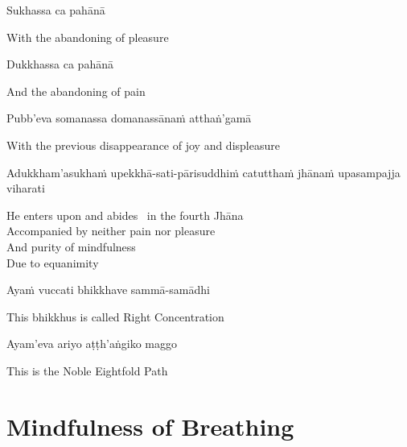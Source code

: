 Sukhassa ca pahānā

\begin{english}
  With the abandoning of pleasure
\end{english}

Dukkhassa ca pahānā

\begin{english}
  And the abandoning of pain
\end{english}

Pubb'eva somanassa domanassānaṁ atthaṅ'gamā

\begin{english}
  With the previous disappearance of joy and displeasure\makeatletter\hyperlink{endnote67-appendix}\makeatother
\end{english}

\begin{pali-hang}
  Adukkham'asukhaṁ upekkhā-sati-pārisuddhiṁ catutthaṁ jhānaṁ upasampajja viharati
\end{pali-hang}

\begin{english-verses}
  He enters upon and abides \breathmark\ in the fourth Jhāna\\
  Accompanied by neither pain nor pleasure\\
  And purity of mindfulness\\
  Due to equanimity
\end{english-verses}

Ayaṁ vuccati bhikkhave sammā-samādhi

\begin{english}
  This bhikkhus is called Right Concentration
\end{english}

Ayam'eva ariyo aṭṭh'aṅgiko maggo

\begin{english}
  This is the Noble Eightfold Path
\end{english}

\suttaRef{[SN 45.8]}

\enlargethispage{\baselineskip\vspace{-0.5em}}

\section{Mindfulness of Breathing}
\label{mindfulness-of-breathing}

